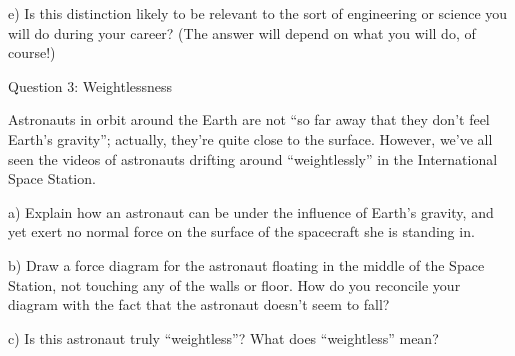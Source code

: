 \documentclass[12pt]{article}
\begin{document}
\vspace{3in}

e) Is this distinction likely to be relevant to the sort of engineering or science you will do during your
career? (The answer will depend on what you will do, of course!)


%
%
%
%
%
%
%
%
%
%
%
\newpage
\centerline{\Large Question 3: Weightlessness}

Astronauts in orbit around the Earth are not ``so far away that they don't feel Earth's gravity'';
actually, they’re quite close to the surface. However, we’ve all seen the videos of astronauts drifting
around ``weightlessly'' in the International Space Station.

a) Explain how an astronaut can be under the influence of Earth's gravity, and yet exert no normal
force on the surface of the spacecraft she is standing in.

\vspace{2in}

b) Draw a force diagram for the astronaut floating in the middle of the Space Station, not touching
any of the walls or floor. How do you reconcile your diagram with the fact that the astronaut
doesn't seem to fall?

\vspace{2in}

c) Is this astronaut truly ``weightless''? What does ``weightless'' mean?

\newpage
\end{document}
